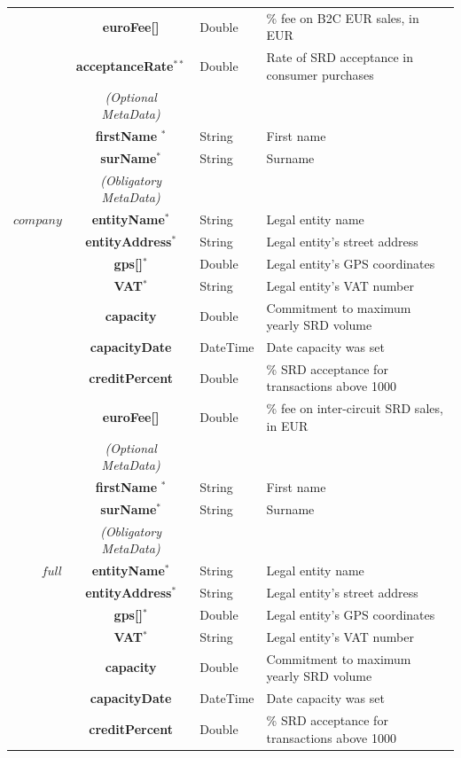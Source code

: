 \begin{table}[H]
\begin{centering}
{\begin{tabular}{ r | c | l | l }
			& {\bf euroFee[]}			&Double	& \% fee on B2C EUR sales, in EUR \\
			& {\bf acceptanceRate}$^{**}$	&Double	& Rate of SRD acceptance in consumer purchases\\
\cline{2-2}
			 & \emph{(Optional MetaData)}& & \\
\cline{2-2}
			& {\bf firstName	}$^*$			&String	& First name \\
			& {\bf surName}$^*$			&String	& Surname \\
\Xhline{1.5pt}
			& \emph{(Obligatory MetaData)} & & \\
\cline{2-2}
$company$	& {\bf entityName}$^*$		&String	& Legal entity name \\
			& {\bf entityAddress}$^*$		&String	& Legal entity's street address \\
			& {\bf gps[]}$^*$			&Double	& Legal entity's GPS coordinates \\
			& {\bf VAT}$^*$				&String	& Legal entity's VAT number \\
			& {\bf capacity}				&Double	& Commitment to maximum yearly SRD volume \\
			& {\bf capacityDate}			&DateTime & Date capacity was set \\
			& {\bf creditPercent}			&Double	& \% SRD acceptance for transactions above 1000 \\
			& {\bf euroFee[]}			&Double	& \% fee on inter-circuit SRD sales, in EUR \\
\cline{2-2}
			 & \emph{(Optional MetaData)}& & \\
\cline{2-2}
			& {\bf firstName	}$^*$			&String & First name \\
			& {\bf surName}$^*$			&String & Surname \\
\Xhline{1.5pt}
			& \emph{(Obligatory MetaData)} & & \\
\cline{2-2}
$full$		& {\bf entityName}$^*$		&String	& Legal entity name \\
			& {\bf entityAddress}$^*$		&String	& Legal entity's street address \\
			& {\bf gps[]}$^*$			&Double	& Legal entity's GPS coordinates \\
			& {\bf VAT}$^*$				&String	& Legal entity's VAT number \\
			& {\bf capacity}				&Double	& Commitment to maximum yearly SRD volume \\
			& {\bf capacityDate}			&DateTime & Date capacity was set \\
			& {\bf creditPercent}			&Double	& \% SRD acceptance for transactions above 1000 \\

\end{tabular}}
\end{centering}
\end{table}

